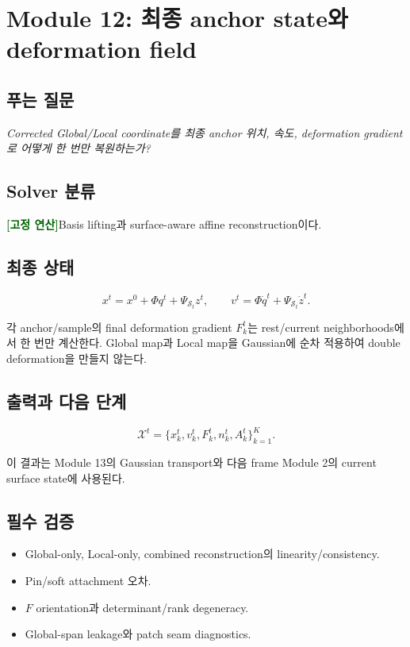 \documentclass[11pt,a4paper]{article}
\newcommand{\deterministic}{\textcolor{darkgreen}{\textbf{[고정 연산]}}}
\begin{document}
\section{Module 12: 최종 anchor state와 deformation field}

\subsection*{푸는 질문}

\emph{Corrected Global/Local coordinate를 최종 anchor 위치, 속도,
deformation gradient로 어떻게 한 번만 복원하는가?}

\subsection*{Solver 분류}

\deterministic Basis lifting과 surface-aware affine reconstruction이다.

\subsection*{최종 상태}

\begin{equation}
  x^t=x^0+\Phi q^t+\Psi_{\mathcal S_t}z^t,
  \qquad
  v^t=\Phi\dot q^t+\Psi_{\mathcal S_t}\dot z^t.
\end{equation}

각 anchor/sample의 final deformation gradient \(F_k^t\)는
rest/current neighborhoods에서 한 번만 계산한다.
Global map과 Local map을 Gaussian에 순차 적용하여 double deformation을 만들지 않는다.

\subsection*{출력과 다음 단계}

\begin{equation}
  \mathcal X^t
  =
  \{x_k^t,v_k^t,F_k^t,n_k^t,A_k^t\}_{k=1}^K.
\end{equation}

이 결과는 Module 13의 Gaussian transport와
다음 frame Module 2의 current surface state에 사용된다.

\subsection*{필수 검증}

\begin{itemize}[leftmargin=1.5em]
  \item Global-only, Local-only, combined reconstruction의 linearity/consistency.
  \item Pin/soft attachment 오차.
  \item \(F\) orientation과 determinant/rank degeneracy.
  \item Global-span leakage와 patch seam diagnostics.
\end{itemize}
\end{document}
